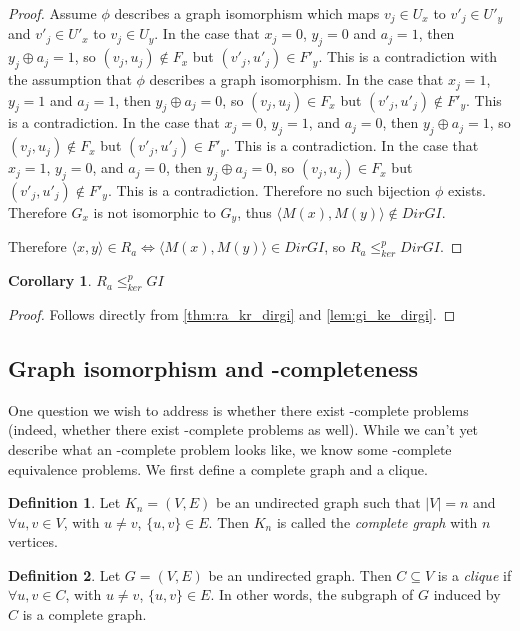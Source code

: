 \documentclass{article}
\newtheorem{corollary}[corollary]{Corollary}
\theoremstyle{definition} \newtheorem{definition}[definition]{Definition}
\newcommand{\kr}{\leq^{p}_{ker}} %
\newcommand{\defn}[1]{\emph{#1}} %
\newcommand{\pair}[2]{\langle#1,#2\rangle} %
\begin{document}
\begin{proof}
  Assume $\phi$ describes a graph isomorphism which maps $v_j\in U_x$ to
  $v'_j\in U'_y$ and $v'_j\in U'_x$ to $v_j\in U_y$. In the case that $x_j=0$,
  $y_j=0$ and $a_j=1$, then $y_j\oplus a_j=1$, so $(v_j, u_j)\notin F_x$ but
  $(v'_j, u'_j)\in F'_y$. This is a contradiction with the assumption that
  $\phi$ describes a graph isomorphism. In the case that $x_j=1$, $y_j=1$ and
  $a_j=1$, then $y_j\oplus a_j=0$, so $(v_j, u_j)\in F_x$ but $(v'_j,
  u'_j)\notin F'_y$. This is a contradiction. In the case that $x_j=0$,
  $y_j=1$, and $a_j=0$, then $y_j\oplus a_j=1$, so $(v_j, u_j)\notin F_x$ but
  $(v'_j, u'_j)\in F'_y$. This is a contradiction. In the case that $x_j=1$,
  $y_j=0$, and $a_j=0$, then $y_j\oplus a_j=0$, so $(v_j, u_j)\in F_x$ but
  $(v'_j, u'_j)\notin F'_y$. This is a contradiction. Therefore no such
  bijection $\phi$ exists. Therefore $G_x$ is not isomorphic to $G_y$, thus
  $\pair{M(x)}{M(y)}\notin DirGI$.

  Therefore $\pair{x}{y}\in R_a\iff \pair{M(x)}{M(y)}\in DirGI$, so $R_a\kr
  DirGI$.
\end{proof}

\begin{corollary}$R_a\kr GI$\end{corollary}
\begin{proof}Follows directly from \autoref{thm:ra_kr_dirgi} and
  \autoref{lem:gi_ke_dirgi}.\end{proof}

\subsection{Graph isomorphism and \texorpdfstring{\NPEq}{NPEq}-completeness}

One question we wish to address is whether there exist \NPEq-complete problems
(indeed, whether there exist \PEq-complete problems as well). While we can't
yet describe what an \NPEq-complete problem looks like, we know some
\NP-complete equivalence problems. We first define a complete graph and a
clique.

\begin{definition}
  Let $K_n=(V, E)$ be an undirected graph such that $|V|=n$ and $\forall u,v\in
  V$, with $u\neq v$, $\{u,v\}\in E$. Then $K_n$ is called the \defn{complete
    graph} with $n$ vertices.
\end{definition}
\begin{definition}
  Let $G=(V,E)$ be an undirected graph. Then $C\subseteq V$ is a \defn{clique}
  if $\forall u,v\in C$, with $u\neq v$, $\{u, v\}\in E$. In other words, the
  subgraph of $G$ induced by $C$ is a complete graph.
\end{definition}
\end{document}
